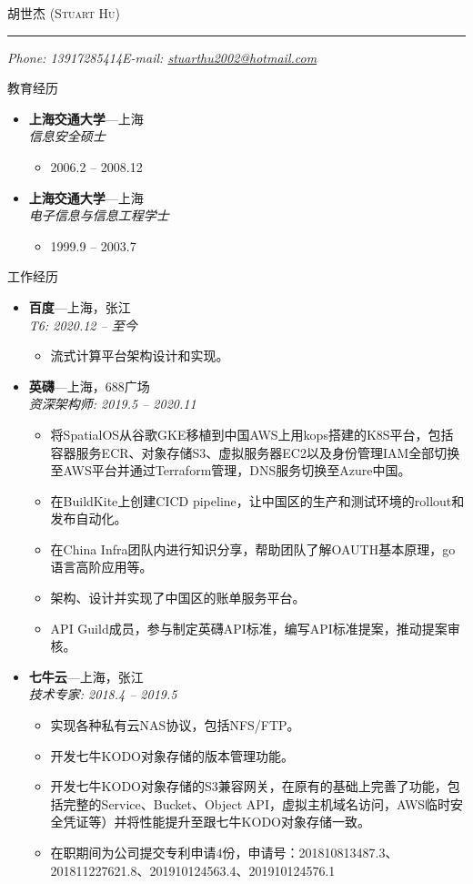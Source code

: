 \documentclass[11pt,oneside]{article}
\makeatletter
\newcommand{\name}{胡世杰 (Stuart Hu)}
\newcommand{\phone}{Phone: 13917285414}
\newcommand{\email}{E-mail: \href{mailto:stuarthu2002@hotmail.com}{stuarthu2002@hotmail.com}}
\newcommand{\bigname}[1]{
	\begin{center}\selectfont\Huge\scshape#1\end{center}
}
\newenvironment{ressection}[1]{
	\vspace{4pt}
	{\selectfont\Large#1}
	\begin{itemize}
	\vspace{3pt}
}{
	\end{itemize}
}
\newcommand{\ressubitem}[1]{
	\vspace{-1pt}
	\item \begin{flushleft} #1 \end{flushleft}
}
\newcommand{\resbigitem}[3]{
	\vspace{-5pt}
	\item
	\textbf{#1}---#2 \\
	\textit{#3}
}
\newenvironment{ressubsec}[3]{
	\resbigitem{#1}{#2}{#3}
	\vspace{-2pt}
	\begin{itemize}
}{
    \end{itemize}
}
\makeatother
\begin{document}
\begin{CJK}{UTF8}{gkai}

\bigname{\name}

\vspace{-8pt} \rule{\textwidth}{1pt}

\vspace{-1pt} {\small\itshape \phone \hfill \email}

\vspace{8 pt}


\begin{ressection}{教育经历}

	\begin{ressubsec}{上海交通大学}{上海}{信息安全硕士}
		\ressubitem{2006.2 -- 2008.12}
	\end{ressubsec}

	\begin{ressubsec}{上海交通大学}{上海}{电子信息与信息工程学士}
		\ressubitem{1999.9 -- 2003.7}
	\end{ressubsec}

\end{ressection}

\begin{ressection}{工作经历}

	\begin{ressubsec}{百度}{上海，张江}{T6: 2020.12 -- 至今}
		\ressubitem{流式计算平台架构设计和实现。}
	\end{ressubsec}

	\begin{ressubsec}{英礴}{上海，688广场}{资深架构师: 2019.5 -- 2020.11}
		\ressubitem{将SpatialOS从谷歌GKE移植到中国AWS上用kops搭建的K8S平台，包括容器服务ECR、对象存储S3、虚拟服务器EC2以及身份管理IAM全部切换至AWS平台并通过Terraform管理，DNS服务切换至Azure中国。}
		\ressubitem{在BuildKite上创建CICD pipeline，让中国区的生产和测试环境的rollout和发布自动化。}
		\ressubitem{在China Infra团队内进行知识分享，帮助团队了解OAUTH基本原理，go语言高阶应用等。}
		\ressubitem{架构、设计并实现了中国区的账单服务平台。}
		\ressubitem{API Guild成员，参与制定英礴API标准，编写API标准提案，推动提案审核。}
	\end{ressubsec}

	\begin{ressubsec}{七牛云}{上海，张江}{技术专家: 2018.4 -- 2019.5}
		\ressubitem{实现各种私有云NAS协议，包括NFS/FTP。}
		\ressubitem{开发七牛KODO对象存储的版本管理功能。}
		\ressubitem{开发七牛KODO对象存储的S3兼容网关，在原有的基础上完善了功能，包括完整的Service、Bucket、Object API，虚拟主机域名访问，AWS临时安全凭证等）并将性能提升至跟七牛KODO对象存储一致。}
		\ressubitem{在职期间为公司提交专利申请4份，申请号：201810813487.3、201811227621.8、201910124563.4、201910124576.1}
	\end{ressubsec}


\end{ressection}
\end{CJK}
\end{document}
